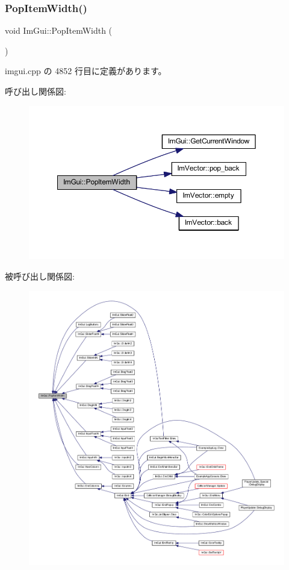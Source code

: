 \subsubsection{\texorpdfstring{Pop\+Item\+Width()}{PopItemWidth()}}
{\footnotesize\ttfamily void Im\+Gui\+::\+Pop\+Item\+Width (\begin{DoxyParamCaption}{ }\end{DoxyParamCaption})}



 imgui.\+cpp の 4852 行目に定義があります。

呼び出し関係図\+:\nopagebreak
\begin{figure}[H]
\begin{center}
\leavevmode
\includegraphics[width=350pt]{namespace_im_gui_ad29a3fc0cb5dfc7f9fc7224512ce90bf_cgraph}
\end{center}
\end{figure}
被呼び出し関係図\+:\nopagebreak
\begin{figure}[H]
\begin{center}
\leavevmode
\includegraphics[width=350pt]{namespace_im_gui_ad29a3fc0cb5dfc7f9fc7224512ce90bf_icgraph}
\end{center}
\end{figure}
